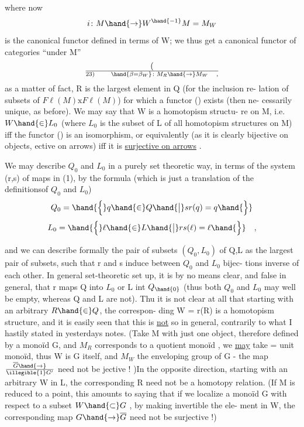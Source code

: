 where now
\[ i\colon M \hand{\to} W^{\hand{-1}}M = M_W \]
is the canonical functor defined in terms of W;  we thus get a canonical 
functor of categories ``under M''
\[ (\over{2}{3}) \qquad \hand{\beta=\beta_W}\colon M_R \hand{\to} M_W \quad , \]
as a matter of fact,  R is the largest element in Q (for the inclusion re-%
lation of subsets of $F\ell(M)\mathrm{x}F\ell(M)$) for which a functor () exists (then ne-%
cessarily unique,  as before).  We may say that W is a homotopism structu-%
re on M,  i.e.  $W\hand{\in}L_0$  (where $L_0$ is the subset of L of all homotopism
structures on M) iff the functor () is an isomorphism,  or equivalently
(as it is clearly bijective on objects,  ective on arrows)  iff it is
\uline{surjective on arrows} .

We may describe $Q_0$ and $L_0$ in a purely set theoretic way,  in terms
of the system (r,s) of maps in (1),  by the formula (which is just a
translation of the definitionsof $Q_0$ and $L_0$)
\[ Q_0 = \hand{\Big\{} q \hand{\in} Q \hand{\big|} sr(q) = q \hand{\Big\}} \]
\[ L_0 = \hand{\Big\{} \ell \hand{\in} L \hand{\big|} rs(\ell) = \ell \hand{\Big\}} \quad , \]

and we can describe formally the pair of subsets $(Q_0,L_0)$  of Q,L  as the
largest pair of subsets, such that r and s induce between $Q_0$ and $L_0$ bijec-%
tions inverse of each other.  In  general set-theoretic set up,  it is
by no means clear,  and false in general,  that r maps Q into $L_0$ or L int
$Q_{\hand{0}}$ (thus both $Q_0$ and $L_0$ may well be empty,  whereas Q and L are not).  Thu
it is not clear at all that starting with an arbitrary $R\hand{\in}Q$,  the correspon-%
ding W = r(R)  is a homotopism structure,  and it is easily seen that this
is \uline{not} so in general, contrarily to what I hastily stated in yesterdays
notes.  (Take M with just one object,  therefore defined by a monoïd G,
and $M_R$  corresponds to a quotient monoïd , we \uline{may} take = unit monoïd,
thus W is G itself, and $M_W$ the enveloping group  of G  -  the  map
$\overline{G} \hand{\to} \over{\illegible{1}}{G'}$  need not be jective ! )In the opposite direction,  starting with
an arbitrary W in L,  the corresponding R need not be a homotopy relation.
(If M is reduced to a point,  this amounts to saying that if we localize
a monoïd G with respect to a subset $W\hand{\subset}G$ ,  by making invertible the ele-%
ment in W,  the corresponding map $G \hand{\to} \overline{G}$ need not be surjective !)

